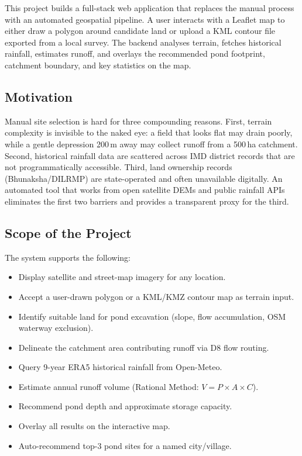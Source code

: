 \documentclass[manuscript,screen,review]{acmart}
\begin{document}
This project builds a full-stack web application that replaces the
manual process with an automated geospatial pipeline. A user
interacts with a Leaflet map to either draw a polygon around
candidate land or upload a KML contour file exported from a local
survey. The backend analyses terrain, fetches historical rainfall,
estimates runoff, and overlays the recommended pond footprint,
catchment boundary, and key statistics on the map.

\subsection{Motivation}

Manual site selection is hard for three compounding reasons. First,
terrain complexity is invisible to the naked eye: a field that looks
flat may drain poorly, while a gentle depression 200\,m away may
collect runoff from a 500\,ha catchment. Second, historical rainfall
data are scattered across IMD district records that are not
programmatically accessible. Third, land ownership records
(Bhunaksha/DILRMP) are state-operated and often unavailable
digitally. An automated tool that works from open satellite DEMs
and public rainfall APIs eliminates the first two barriers and
provides a transparent proxy for the third.

\subsection{Scope of the Project}

The system supports the following:
\begin{itemize}
  \item Display satellite and street-map imagery for any location.
  \item Accept a user-drawn polygon or a KML/KMZ contour map as terrain input.
  \item Identify suitable land for pond excavation (slope, flow accumulation, OSM waterway exclusion).
  \item Delineate the catchment area contributing runoff via D8 flow routing.
  \item Query 9-year ERA5 historical rainfall from Open-Meteo.
  \item Estimate annual runoff volume (Rational Method: $V = P \times A \times C$).
  \item Recommend pond depth and approximate storage capacity.
  \item Overlay all results on the interactive map.
  \item Auto-recommend top-3 pond sites for a named city/village.
\end{itemize}
\end{document}
